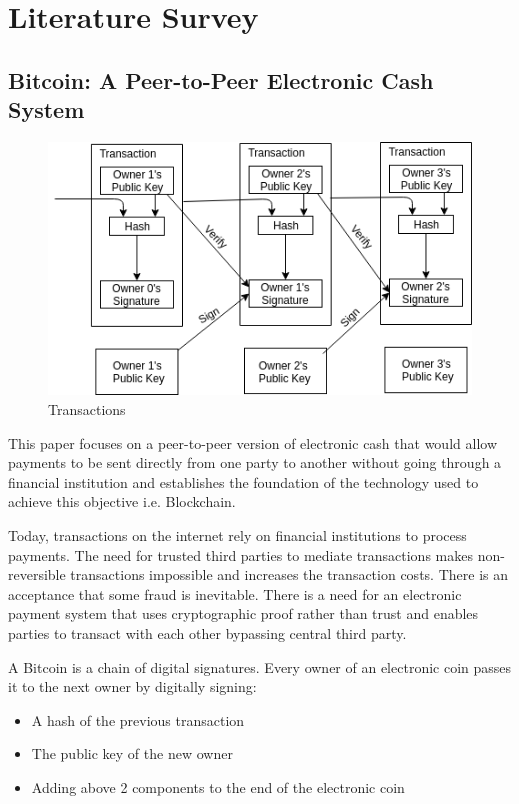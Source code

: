 \chapter{Literature Survey}


\section {\textbf{ Bitcoin: A Peer-to-Peer Electronic Cash System}}
	\begin{figure}[!b]
	\centering
	\includegraphics[width=\linewidth]{Images/BlockDiagramOfTransaction.png}
	\caption{Transactions}
\end{figure}
	      This paper focuses on a peer-to-peer version of electronic cash that would allow payments to be sent directly from one party to another without going through a financial institution and establishes the foundation of the technology used to achieve this objective i.e. Blockchain.
	      
        Today, transactions on the internet rely on financial institutions to process payments. The need for trusted third parties to mediate transactions makes non-reversible transactions impossible and increases the transaction costs. There is an acceptance that some fraud is inevitable. There is a need for an electronic payment system that uses cryptographic proof rather than trust and enables parties to transact with each other bypassing central third party.
	     
	    A Bitcoin is a chain of digital signatures. Every owner of an electronic coin passes it to the next owner by digitally signing: 
	    \begin{itemize}
	        \item A hash of the previous transaction
	        \item The public key of the new owner
	        \item Adding above 2 components to the end of the electronic coin
	    \end{itemize}
        
